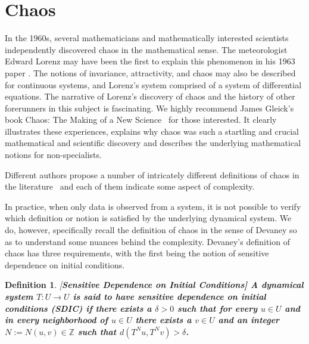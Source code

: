 \documentclass[a4paper,12pt,twoside]{report}
\newtheorem{Definition}{Definition}[]
\begin{document}

\section{Chaos}

In the 1960s, several mathematicians and mathematically interested scientists independently discovered chaos in the mathematical sense. The meteorologist Edward Lorenz may have been the first to explain this phenomenon in his 1963 paper \cite{lorenz1963deterministic}. The notions of invariance, attractivity, and chaos may also be described for continuous systems, and Lorenz's system comprised of a system of differential equations. 
The narrative of Lorenz's discovery of chaos and the history of other forerunners in this subject is fascinating. We highly recommend James Gleick's book Chaos: The Making of a New Science~\cite{gleick2008chaos} for those interested. It clearly illustrates these experiences, explains why chaos was such a startling and crucial mathematical and scientific discovery and describes the underlying mathematical notions for non-specialists.

Different authors propose a number of intricately different definitions of chaos in the literature~\cite{RasbandChaos, TaborChaos, WigginsChaos} and each of them indicate some aspect of complexity.

In practice, when only data is observed from a system, it is not possible to verify which definition or notion is satisfied by the underlying dynamical system. We do, however, specifically recall the definition of chaos in the sense of Devaney \cite{devaney2018introduction,de2013elements} so as to understand some nuances behind the complexity. Devaney's definition of chaos has three requirements, with the first being the notion  of sensitive dependence on initial conditions. 

\begin{Definition}\rm
  [\bf {Sensitive Dependence on Initial Conditions}]\label{Dfn_SDIC}\rm
A dynamical system $T: U \to U$ is said to have sensitive dependence on initial conditions (SDIC) if there exists a $\delta > 0$ such that for every $u \in U$ and in every neighborhood of $u \in U$ there exists a $v\in{U}$ and an integer $N:=N{(u,v)}\in\mathbb{Z}$ such that $d(T^Nu,T^Nv)>\delta$. 	
\end{Definition}
\end{document}
